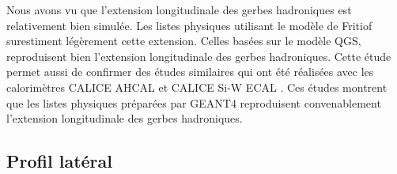 Nous avons vu que l'extension longitudinale des gerbes hadroniques est relativement bien simulée. Les listes physiques utilisant le modèle de Fritiof surestiment légèrement cette extension. Celles basées sur le modèle QGS, reproduisent bien l'extension longitudinale des gerbes hadroniques. Cette étude permet aussi de confirmer des études similaires qui ont été réalisées avec les calorimètres CALICE AHCAL \cite{geant4-ahcal} et CALICE Si-W ECAL \cite{naomi}. Ces études montrent que les listes physiques préparées par GEANT4 reproduisent convenablement l'extension longitudinale des gerbes hadroniques.

\newpage
\subsection{Profil latéral}
\label{sec.lateralProfil}

